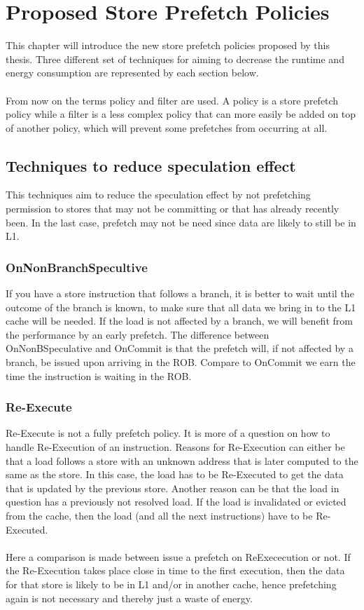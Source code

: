 \chapter{Proposed Store Prefetch Policies}
\label{chap:ProposedPrefetchPolicies}
This chapter will introduce the new store prefetch policies proposed by this thesis. Three different set of techniques for aiming to decrease the runtime and energy consumption are represented by each section below.
\\ \\
From now on the terms policy and filter are used. A policy is a store prefetch policy while a filter is a less complex policy that can more easily be added on top of another policy, which will prevent some prefetches from occurring at all.
\section{Techniques to reduce speculation effect} 
This techniques aim to reduce the speculation effect by not prefetching permission to stores that may not be committing or that has already recently been. In the last case, prefetch may not be need since data are likely to still be in L1.
\subsection{OnNonBranchSpecultive}
If you have a store instruction that follows a branch, it is better to wait until the outcome of the branch is known, to make
sure that all data we bring in to the L1 cache will be needed. If
the load is not affected by a branch, we will benefit from the performance by an early prefetch. The difference between OnNonBSpeculative and OnCommit
is that the prefetch will, if not affected by a branch, be issued upon arriving in the
ROB. Compare to OnCommit we earn the time the instruction is waiting in the ROB.
\subsection{Re-Execute}
Re-Execute is not a fully prefetch policy. It is more of a question on how to handle Re-Execution of an instruction. 
 Reasons for Re-Execution can
either be that a load follows a store with an unknown address that is later computed to
the same as the store. In this case, the load has to be Re-Executed to get the data that
is updated by the previous store. Another reason can be that the load in question has
a previously not resolved load. If the load is invalidated or evicted from the cache,
then the load (and all the next instructions) have to be Re-Executed.
\\ \\
Here a comparison is made between issue a prefetch on ReExececution
or not. If the Re-Execution takes place close in time to the first execution, then the data
for that store is likely to be in L1 and/or in another cache, hence prefetching again
is not necessary and thereby just a waste of energy.
